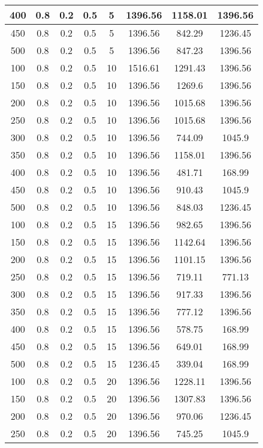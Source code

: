 \documentclass[a4paper, 12pt]{extreport}
\begin{document}
\begin{itemize}
\begin{longtable}{|c|c|c|c|c|c|c|c|}
			400 & 0.8 & 0.2 & 0.5 & 5 & 1396.56 & 1158.01 & 1396.56 \\\hline
			450 & 0.8 & 0.2 & 0.5 & 5 & 1396.56 & 842.29 & 1236.45 \\\hline
			500 & 0.8 & 0.2 & 0.5 & 5 & 1396.56 & 847.23 & 1396.56 \\\hline
			100 & 0.8 & 0.2 & 0.5 & 10 & 1516.61 & 1291.43 & 1396.56 \\\hline
			150 & 0.8 & 0.2 & 0.5 & 10 & 1396.56 & 1269.6 & 1396.56 \\\hline
			200 & 0.8 & 0.2 & 0.5 & 10 & 1396.56 & 1015.68 & 1396.56 \\\hline
			250 & 0.8 & 0.2 & 0.5 & 10 & 1396.56 & 1015.68 & 1396.56 \\\hline
			300 & 0.8 & 0.2 & 0.5 & 10 & 1396.56 & 744.09 & 1045.9 \\\hline
			350 & 0.8 & 0.2 & 0.5 & 10 & 1396.56 & 1158.01 & 1396.56 \\\hline
			400 & 0.8 & 0.2 & 0.5 & 10 & 1396.56 & 481.71 & 168.99 \\\hline
			450 & 0.8 & 0.2 & 0.5 & 10 & 1396.56 & 910.43 & 1045.9 \\\hline
			500 & 0.8 & 0.2 & 0.5 & 10 & 1396.56 & 848.03 & 1236.45 \\\hline
			100 & 0.8 & 0.2 & 0.5 & 15 & 1396.56 & 982.65 & 1396.56 \\\hline
			150 & 0.8 & 0.2 & 0.5 & 15 & 1396.56 & 1142.64 & 1396.56 \\\hline
			200 & 0.8 & 0.2 & 0.5 & 15 & 1396.56 & 1101.15 & 1396.56 \\\hline
			250 & 0.8 & 0.2 & 0.5 & 15 & 1396.56 & 719.11 & 771.13 \\\hline
			300 & 0.8 & 0.2 & 0.5 & 15 & 1396.56 & 917.33 & 1396.56 \\\hline
			350 & 0.8 & 0.2 & 0.5 & 15 & 1396.56 & 777.12 & 1396.56 \\\hline
			400 & 0.8 & 0.2 & 0.5 & 15 & 1396.56 & 578.75 & 168.99 \\\hline
			450 & 0.8 & 0.2 & 0.5 & 15 & 1396.56 & 649.01 & 168.99 \\\hline
			500 & 0.8 & 0.2 & 0.5 & 15 & 1236.45 & 339.04 & 168.99 \\\hline
			100 & 0.8 & 0.2 & 0.5 & 20 & 1396.56 & 1228.11 & 1396.56 \\\hline
			150 & 0.8 & 0.2 & 0.5 & 20 & 1396.56 & 1307.83 & 1396.56 \\\hline
			200 & 0.8 & 0.2 & 0.5 & 20 & 1396.56 & 970.06 & 1236.45 \\\hline
			250 & 0.8 & 0.2 & 0.5 & 20 & 1396.56 & 745.25 & 1045.9 \\\hline

\end{longtable}
\end{itemize}
\end{document}
